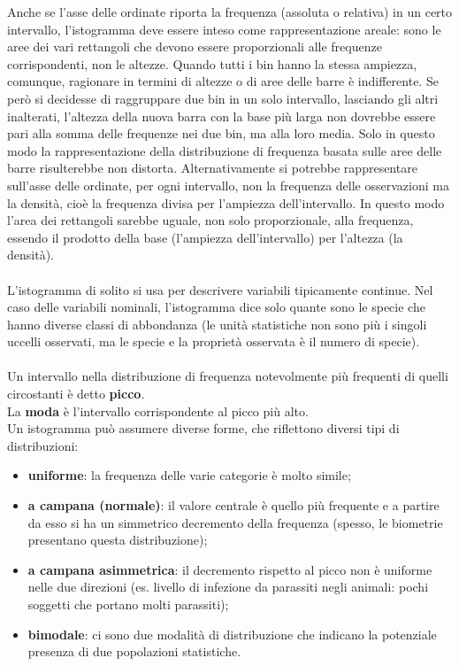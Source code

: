 \documentclass[10pt, draft]{book}
\begin{document}
Anche se l'asse delle ordinate riporta la frequenza (assoluta o relativa) in un certo intervallo, l'istogramma deve essere inteso come rappresentazione areale: sono le aree dei vari rettangoli che devono essere proporzionali alle frequenze corrispondenti, non le altezze. Quando tutti i bin hanno la stessa ampiezza, comunque, ragionare in termini di altezze o di aree delle barre è indifferente. Se però si decidesse di raggruppare due bin in un solo intervallo, lasciando gli altri inalterati, l'altezza della nuova barra con la base più larga non dovrebbe essere pari alla somma delle frequenze nei due bin, ma alla loro media. Solo in questo modo la rappresentazione della distribuzione di frequenza basata sulle aree delle barre risulterebbe non distorta. Alternativamente si potrebbe rappresentare sull'asse delle ordinate, per ogni intervallo, non la frequenza delle osservazioni ma la densità, cioè la frequenza divisa per l'ampiezza dell'intervallo. In questo modo l'area dei rettangoli sarebbe uguale, non solo proporzionale, alla frequenza, essendo il prodotto della base (l'ampiezza dell'intervallo) per l'altezza (la densità).
\\
\\
L’istogramma di solito si usa per descrivere variabili tipicamente continue. Nel caso delle variabili nominali, l’istogramma dice solo quante sono le specie che hanno diverse classi di abbondanza (le unità statistiche non sono più i singoli uccelli osservati, ma le specie e la proprietà osservata è il numero di specie).
\\
\\
Un intervallo nella distribuzione di frequenza notevolmente più frequenti di quelli circostanti è detto \textbf{picco}.
\\
La \textbf{moda} è l'intervallo corrispondente al picco più alto.
\\
Un istogramma può assumere diverse forme, che riflettono diversi tipi di distribuzioni:
\begin{itemize}
    \item \textbf{uniforme}: la frequenza delle varie categorie è molto simile;
    \item \textbf{a campana (normale)}: il valore centrale è quello più frequente e a partire da esso si ha un simmetrico decremento della frequenza (spesso, le biometrie presentano questa distribuzione);
    \item \textbf{a campana asimmetrica}: il decremento rispetto al picco non è uniforme nelle due direzioni (es. livello di infezione da parassiti negli animali: pochi soggetti che portano molti parassiti);
    \item \textbf{bimodale}: ci sono due modalità di distribuzione che indicano la potenziale presenza di due popolazioni statistiche.
\end{itemize}
\end{document}
